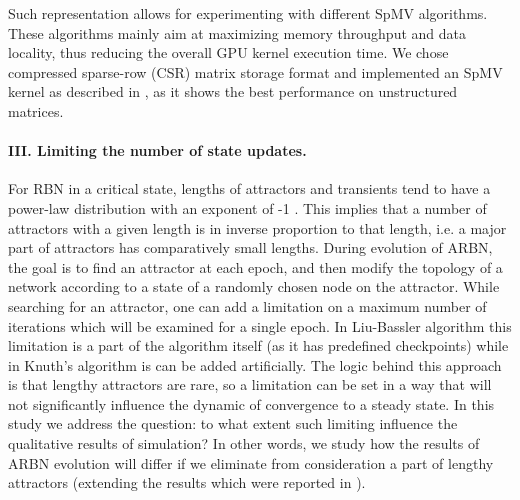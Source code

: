 \documentclass[procedia]{easychair}
\begin{document}
	 Such representation allows for experimenting with different SpMV algorithms. These algorithms mainly aim at maximizing memory throughput and data locality, thus reducing the overall GPU kernel execution time. We chose compressed sparse-row (CSR) matrix storage format and implemented an SpMV kernel as described in \cite{bell2008efficient}, as it shows the best performance on unstructured matrices.
	
	
	\paragraph{III. Limiting the number of state updates.} For RBN in a critical state, lengths of attractors and transients tend to have a power-law distribution with an exponent of -1 \cite{greil2009attractor}. This implies that a number of attractors with a given length is in inverse proportion to that length, i.e. a major part of attractors has comparatively small lengths. During evolution of ARBN, the goal is to find an attractor at each epoch, and then modify the topology of a network according to a state of a randomly chosen node on the attractor. While searching for an attractor, one can add a limitation on a maximum number of iterations which will be examined for a single epoch. In Liu-Bassler algorithm this limitation is a part of the algorithm itself (as it has predefined checkpoints) while in Knuth's algorithm is can be added artificially. The logic behind this approach is that lengthy attractors are rare, so a limitation can be set in a way that will not significantly influence the dynamic of convergence to a steady state. In this study we address the question: to what extent such limiting influence the qualitative results of simulation? In other words, we study how the results of ARBN evolution will differ if we eliminate from consideration a part of lengthy attractors (extending the results which were reported in \cite{Gorski2016}).
\end{document}
